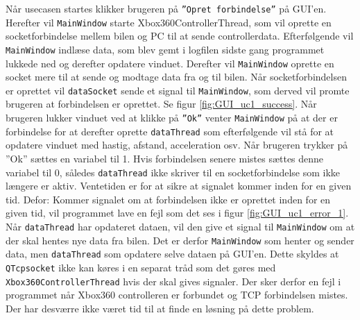 Når usecasen startes klikker brugeren på \texttt{''Opret forbindelse''} på GUI'en. Herefter vil \texttt{MainWindow} starte Xbox360ControllerThread, som vil oprette en socketforbindelse mellem bilen og PC til at sende controllerdata. Efterfølgende vil \texttt{MainWindow} indlæse data, som blev gemt i logfilen sidste gang programmet lukkede ned og derefter opdatere vinduet. Derefter vil \texttt{MainWindow} oprette en socket mere til at sende og modtage data fra og til bilen. Når socketforbindelsen er oprettet vil \texttt{dataSocket} sende et signal til \texttt{MainWindow}, som derved vil promte brugeren at forbindelsen er oprettet. Se figur \ref{fig:GUI_uc1_success}. Når brugeren lukker vinduet ved at klikke på \texttt{''Ok''} venter \texttt{MainWindow} på at der er forbindelse for at derefter oprette \texttt{dataThread} som efterfølgende vil stå for at opdatere vinduet med hastig, afstand, acceleration osv. Når brugeren trykker på ''Ok'' sættes en variabel til 1. Hvis forbindelsen senere mistes sættes denne variabel til 0, således \texttt{dataThread} ikke skriver til en socketforbindelse som ikke længere er aktiv. Ventetiden er for at sikre at signalet kommer inden for en given tid. Defor: Kommer signalet om at forbindelsen ikke er oprettet inden for en given tid, vil programmet lave en fejl som det ses i figur \ref{fig:GUI_uc1_error_1}. Når \texttt{dataThread} har opdateret dataen, vil den give et signal til \texttt{MainWindow} om at der skal hentes nye data fra bilen. Det er derfor \texttt{MainWindow} som henter og sender data, men \texttt{dataThread} som opdatere selve dataen på GUI'en. Dette skyldes at \texttt{QTcpsocket} ikke kan køres i en separat tråd som det gøres med \texttt{Xbox360ControllerThread} hvis der skal gives signaler. Der sker derfor en fejl i programmet når Xbox360 controlleren er forbundet og TCP forbindelsen mistes. Der har desværre ikke været tid til at finde en løsning på dette problem.  


